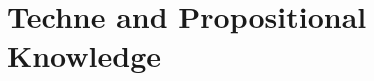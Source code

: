 ﻿\documentclass[11pt]{amsart}
\begin{document}












\section{Techne and Propositional Knowledge}

\end{document}
